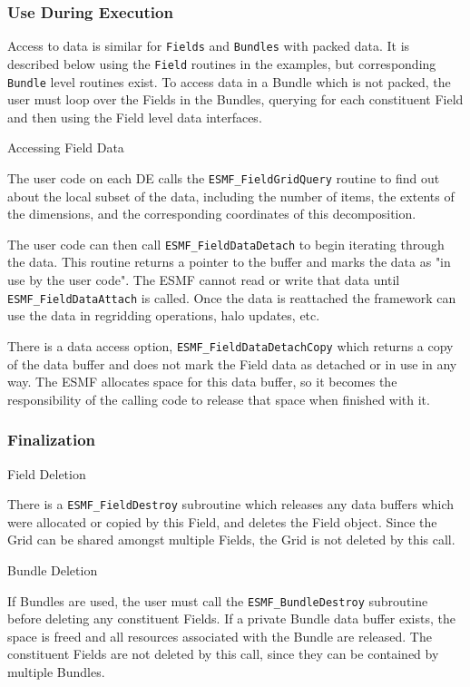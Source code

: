 \subsubsection{Use During Execution}

Access to data is similar for {\tt Fields} and {\tt Bundles} with
packed data.  It is described below using the {\tt Field}
routines in the examples, but corresponding {\tt Bundle} level
routines exist.  To access data in a
Bundle which is not packed, the user must loop over the
Fields in the Bundles, querying for each
constituent Field and then using the Field level data interfaces.

\begin{description}

\item{Accessing Field Data}

The user code on each DE calls the {\tt ESMF\_FieldGridQuery}
routine to find out about the local subset of the data, including
the number of items, the extents
of the dimensions, and the corresponding coordinates of this
decomposition.

The user code can then call {\tt ESMF\_FieldDataDetach} to
begin iterating through the data.  This routine returns a
pointer to the buffer and marks the data as "in use by
the user code".  The ESMF cannot read or write that
data until {\tt ESMF\_FieldDataAttach} is called.  Once the data
is reattached the framework can use the data in regridding 
operations, halo updates, etc.  

There is a data access option, {\tt ESMF\_FieldDataDetachCopy}
which returns a copy of the data buffer and does not mark the
Field data as detached or in use in any way.  The ESMF 
allocates space for this data buffer, so it becomes the
responsibility of the calling code to release that space 
when finished with it.

\end{description}

\subsubsection{Finalization}

\begin{description}

\item{Field Deletion}

There is a {\tt ESMF\_FieldDestroy} subroutine which releases
any data buffers which were allocated or copied by this Field,
and deletes the Field object.  Since the Grid can be shared
amongst multiple Fields, the Grid is not deleted by this call.

\item{Bundle Deletion}

If Bundles are used, the user must call the 
{\tt ESMF\_BundleDestroy} subroutine before deleting any constituent
Fields.  If a private Bundle data buffer exists, the space is
freed and all resources associated with the Bundle are released.
The constituent Fields are not deleted by this call, since they
can be contained by multiple Bundles.

\end{description}

